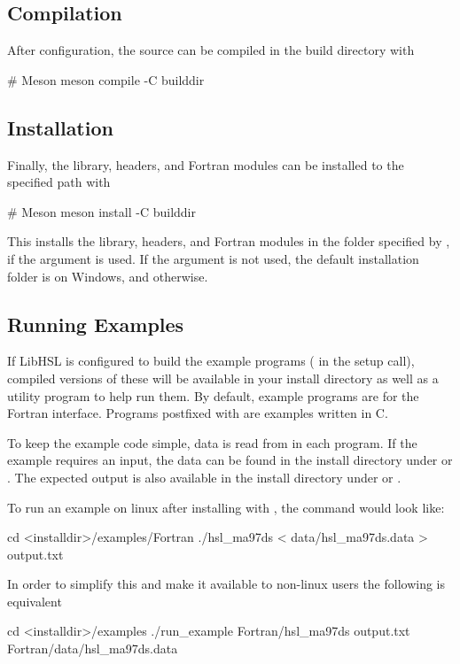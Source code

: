 \documentclass[gdweb]{geradwp}
\renewcommand{\_}{\raisebox{+0.35mm}{\textunderscore}}
\newcommand{\LibHSL}{LibHSL\xspace}
\begin{document}
\subsection{Compilation}

After configuration, the source can be compiled in the build directory with

\begin{jllisting}
# Meson
meson compile -C builddir
\end{jllisting}

\subsection{Installation}

Finally, the library, headers, and Fortran modules can be installed to the specified path with

\begin{jllisting}
# Meson
meson install -C builddir
\end{jllisting}

This installs the library, headers, and Fortran modules in the folder specified by , if the argument is used.
If the argument  is not used, the default installation folder is  on Windows, and  otherwise.


\subsection{Running Examples}

If \LibHSL is configured to build the example programs ( in the setup call),
compiled versions of these will be available in your install directory as well
as a utility program  to help run them.
By default, example programs are for the Fortran interface.
Programs postfixed with  are examples written in C.

To keep the example code simple, data is read from  in each program.
If the example requires an input, the data can be found in the install directory
under  or .
The expected output is also available in the install directory under
 or .

To run an example on linux after installing with ,
the command would look like:
\begin{jllisting}
cd <installdir>/examples/Fortran
./hsl_ma97ds < data/hsl_ma97ds.data > output.txt
\end{jllisting}
In order to simplify this and make it available to non-linux users the following is equivalent
\begin{jllisting}
cd <installdir>/examples
./run_example Fortran/hsl_ma97ds output.txt Fortran/data/hsl_ma97ds.data
\end{jllisting}
\end{document}
